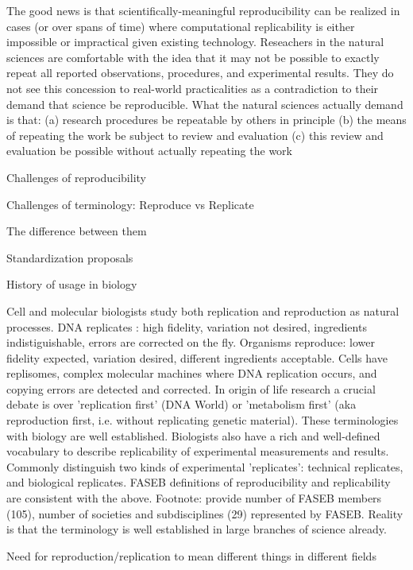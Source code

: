 	The good news is that scientifically-meaningful reproducibility can be realized in cases (or over spans of time)
		where computational replicability is either impossible or impractical given existing technology.
	Reseachers in the natural sciences are comfortable with the idea that it may not be possible to exactly
		repeat all reported observations, procedures, and experimental results.
	They do not see this concession to real-world practicalities as a contradiction to their demand that science be reproducible.
	What the natural sciences actually demand is that:
		(a) research procedures be repeatable by others in principle
		(b) the means of repeating the work be subject to review and evaluation
		(c) this review and evaluation be possible without actually repeating the work

Challenges of reproducibility

	Challenges of terminology: Reproduce vs Replicate

		The difference between them

		Standardization proposals

		History of usage in biology

			Cell and molecular biologists study both replication and reproduction as natural processes.
			DNA replicates :  high fidelity, variation not desired, ingredients indistiguishable, errors are corrected on the fly.
			Organisms reproduce:  lower fidelity expected, variation desired, different ingredients acceptable.
			Cells have replisomes, complex molecular machines where DNA replication occurs, and copying errors are detected and corrected.
			In origin of life research a crucial debate is over 'replication first' (DNA World) or 
 					'metabolism first' (aka reproduction first, i.e. without replicating genetic material).
			These terminologies with biology are well established.
			Biologists also have a rich and well-defined vocabulary to describe replicability of experimental measurements and results.
			Commonly distinguish two kinds of experimental 'replicates':  technical replicates, and biological replicates.
			FASEB definitions of reproducibility and replicability are consistent with the above.
			Footnote: provide number of FASEB members (105), number of societies and subdisciplines (29) represented by FASEB.
 			Reality is that the terminology is well established in large branches of science already.

		Need for reproduction/replication to mean different things in different fields

